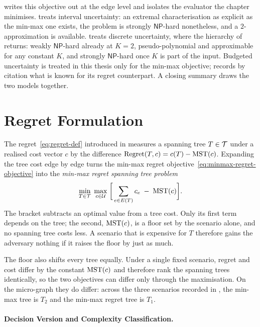  writes this objective out at the edge level and isolates the evaluator the chapter minimises.
 treats interval uncertainty: an extremal characterisation as explicit as the min-max one exists, the problem is strongly $\mathsf{NP}$-hard nonetheless, and a $2$-approximation is available.
 treats discrete uncertainty, where the hierarchy of  returns: weakly $\mathsf{NP}$-hard already at $K = 2$, pseudo-polynomial and approximable for any constant $K$, and strongly $\mathsf{NP}$-hard once $K$ is part of the input.
Budgeted uncertainty is treated in this thesis only for the min-max objective;  records by citation what is known for its regret counterpart.
A closing summary draws the two models together.

\section{Regret Formulation}\label{sec:regret-formulation}

The regret~\eqref{eq:regret-def} introduced in  measures a spanning tree $T \in \mathcal{T}$ under a realised cost vector $c$ by the difference $\operatorname{Regret}(T,c) = c(T) - \mathrm{MST}(c)$.
Expanding the tree cost edge by edge turns the min-max regret objective~\eqref{eq:minmax-regret-objective} into the \emph{\textcolor{RWTHBlue}{min-max regret spanning tree problem}}
\begin{equation}\label{eq:regret-objective}
\min_{T \in \mathcal{T}}\; \max_{c \in \mathcal{U}}\; \biggl[\, \sum_{e \in E(T)} c_e \;-\; \mathrm{MST}(c) \biggr].
\end{equation}
The bracket subtracts an optimal value from a tree cost.
Only its first term depends on the tree; the second, $\mathrm{MST}(c)$, is a floor set by the scenario alone, and no spanning tree costs less.
A scenario that is expensive for $T$ therefore gains the adversary nothing if it raises the floor by just as much.

The floor also shifts every tree equally.
Under a single fixed scenario, regret and cost differ by the constant $\mathrm{MST}(c)$ and therefore rank the spanning trees identically, so the two objectives can differ only through the maximisation.
On the micro-graph they do differ: across the three scenarios recorded in , the min-max tree is $T_2$ and the min-max regret tree is $T_1$.

\paragraph{Decision Version and Complexity Classification.}

